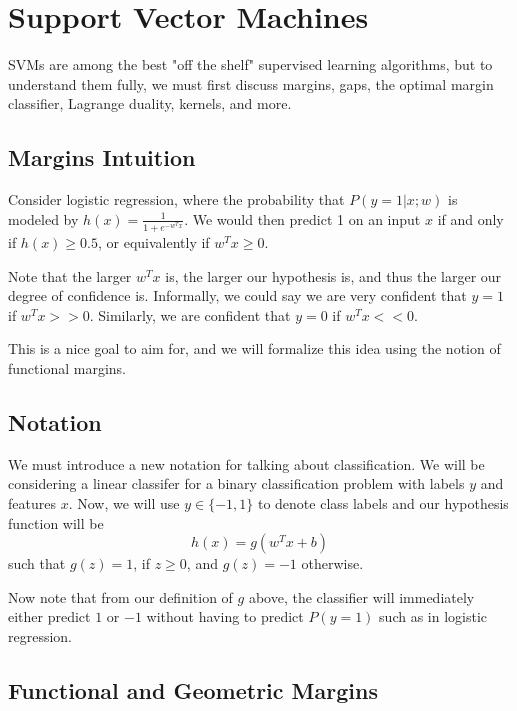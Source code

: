 \documentclass[12pt]{scrartcl}
\begin{document}
\section{Support Vector Machines}

SVMs are among the best "off the shelf" supervised learning algorithms, but to
understand them fully, we must first discuss margins, gaps, the optimal margin
classifier, Lagrange duality, kernels, and more.

\subsection{Margins Intuition}

Consider logistic regression, where the probability that $P(y = 1 | x; w)$ is
modeled by $h(x) = \frac{1}{1 + e^{-w^Tx}}$. We would then predict 1 on an
input $x$ if and only if $h(x) \geq 0.5$, or equivalently if $w^Tx \geq 0$.

\begin{note}
    Note that the larger $w^Tx$ is, the larger our hypothesis is, and thus the larger our degree of confidence is. Informally, we could say we are very confident that $y = 1$ if $w^Tx >> 0$. Similarly, we are confident that $y = 0$ if $w^Tx << 0$.
\end{note}

This is a nice goal to aim for, and we will formalize this idea using the
notion of functional margins.

\subsection{Notation}

We must introduce a new notation for talking about classification. We will be
considering a linear classifer for a binary classification problem with labels
$y$ and features $x$. Now, we will use $y \in \{-1, 1\}$ to denote class labels
and our hypothesis function will be
\[h(x) = g(w^Tx + b)\]
such that $g(z) = 1$, if $z \geq 0$, and $g(z) = -1$ otherwise.
\begin{note}
    Now note that from our definition of $g$ above, the classifier will immediately either predict $1$ or $-1$ without having to predict $P(y = 1)$ such as in logistic regression.
\end{note}

\subsection{Functional and Geometric Margins}
\end{document}
